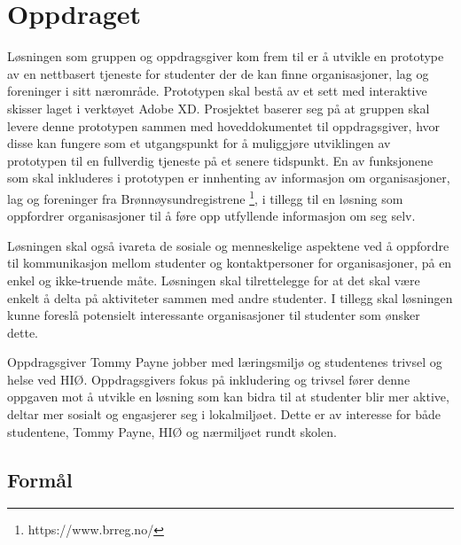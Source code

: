 \section{Oppdraget}
Løsningen som gruppen og oppdragsgiver kom frem til er å utvikle en prototype av en nettbasert tjeneste for studenter der de kan finne organisasjoner, lag og foreninger i sitt nærområde. Prototypen skal bestå av et sett med interaktive skisser laget i verktøyet Adobe XD. Prosjektet baserer seg på at gruppen skal levere denne prototypen sammen med hoveddokumentet til oppdragsgiver, hvor disse kan fungere som et utgangspunkt for å muliggjøre utviklingen av prototypen til en fullverdig tjeneste på et senere tidspunkt. En av funksjonene som skal inkluderes i prototypen er innhenting av informasjon om organisasjoner, lag og foreninger fra Brønnøysundregistrene \footnote{https://www.brreg.no/}, i tillegg til en løsning som oppfordrer organisasjoner til å føre opp utfyllende informasjon om seg selv.

Løsningen skal også ivareta de sosiale og menneskelige aspektene ved å oppfordre til kommunikasjon mellom studenter og kontaktpersoner for organisasjoner, på en enkel og ikke-truende måte. Løsningen skal tilrettelegge for at det skal være enkelt å delta på aktiviteter sammen med andre studenter. I tillegg skal løsningen kunne foreslå potensielt interessante organisasjoner til studenter som ønsker dette.

Oppdragsgiver Tommy Payne jobber med læringsmiljø og studentenes trivsel og helse ved HIØ. Oppdragsgivers fokus på inkludering og trivsel fører denne oppgaven mot å utvikle en løsning som kan bidra til at studenter blir mer aktive, deltar mer sosialt og engasjerer seg i lokalmiljøet. Dette er av interesse for både studentene, Tommy Payne, HIØ og nærmiljøet rundt skolen.

\subsection{Formål}
\label{sec:maal-metode-resultater}

